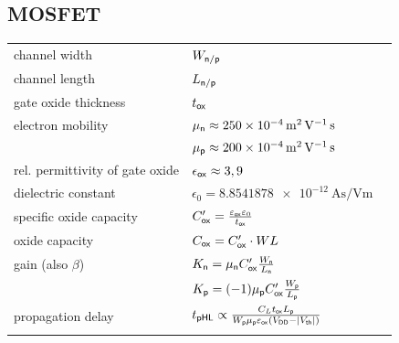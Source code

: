 \begin{sectionbox}
	\subsection{MOSFET}
	\begin{tabular*}{\columnwidth}{@{\extracolsep\fill}lll@{}} \ctrule
		channel width & $W_{\sf n/p}$ \\[0.5em]
		channel length & $L_{\sf n/p}$ \\[0.5em]
		gate oxide thickness & $t_{\sf ox}$ \\[0.5em]
		electron mobility & $\mu_{\sf n} \approx \SI{250e-4}{\meter\squared\per\volt\second}$ \\[0.5em]
		& $\mu_{\sf p} \approx \SI{200e-4}{\meter\squared\per\volt\second}$ \\[0.5em]
		rel. permittivity of gate oxide & $\epsilon_{\sf ox} \approx 3,9$ \\[0.5em]
		dielectric constant & $\epsilon_0 = \SI{8.8541878e-12}{\ampere\second\per\volt\meter}$ \\ \cmrule
		specific oxide capacity & $C'_{\sf ox} = \frac{\varepsilon_{\sf ox} \varepsilon_0}{t_{\sf ox}}$ \\[0.5em]
		oxide capacity & $C_{\sf ox} = C'_{\sf ox} \cdot WL$\\[0.5em]
		gain (also $\beta$) & $K_{\sf n} = \mu_{\sf n} C'_{\sf ox} \frac{W_{\sf n}}{L_{\sf n}}$\\[0.5em]
			& $K_{\sf p} = (-1) \mu_{\sf p} C'_{\sf ox} \frac{W_{\sf p}}{L_{\sf p}}$\\[0.5em]
		propagation delay & $t_{\sf pHL} \propto \frac{C_L t_{\sf ox} L_{\sf p}}{W_{\sf p} \mu_{\sf p} \varepsilon_{\sf ox} (V_{\sf DD} - |V_{\sf th}|)}$ \\
		\cbrule
	\end{tabular*}
\end{sectionbox}






